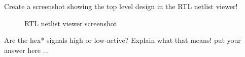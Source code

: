 \documentclass[10pt,a4paper,titlepage,oneside]{article}
\begin{document}
\maketitle



\begin{qa}{Create a screenshot showing the top level design in the RTL netlist viewer!}
	\begin{figure}[h!]
		\centering
		\dummyimage
		\caption{RTL netlist viewer screenshot}
	\end{figure}
\end{qa}



\begin{qa}{Are the \textsf{hex*} signals high or low-active? Explain what that means!}
put your answer here ...
\end{qa}

\end{document}
